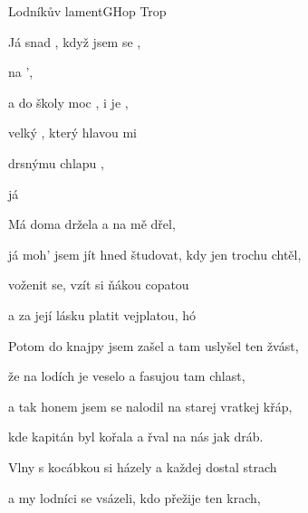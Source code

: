 \begin{song}{Lodníkův lament}{G}{Hop Trop}

\begin{SBVerse}

Já snad , když jsem se ,

na   ',

a do školy moc , i  je  ,

velký , který hlavou mi  

drsnýmu chlapu ,

já  


\end{SBVerse}

\begin{SBChorus}

Má doma držela a  na mě dřel,

já moh' jsem jít hned študovat, kdy jen trochu chtěl,

voženit se, vzít si ňákou  copatou

a za její lásku platit  vejplatou, hó 

\end{SBChorus}

\begin{SBVerse}

Potom do knajpy jsem zašel a tam uslyšel ten žvást,

že na lodích je veselo a fasujou tam chlast,

a tak honem jsem se nalodil na starej vratkej křáp,

kde kapitán byl kořala a řval na nás jak dráb.

\end{SBVerse}

\begin{SBChorus}

\end{SBChorus}

\begin{SBVerse}

Vlny s kocábkou si házely a každej dostal strach

a my lodníci se vsázeli, kdo přežije ten krach,


\end{SBVerse}
\end{song}
